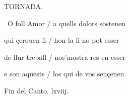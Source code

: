 \documentclass[12pt]{article}
\begin{document}
\begin{estrofaExtra}%




\begin{tornada}

TORNADA.

\end{tornada}


\end{estrofaExtra}


\begin{estrofa}

 \textparagraph\  O foll Amor / a quells dolors sostenen

 qui \c{c}erquen fi / hon la fi no pot esser

 de llur treball / nos'mostra res en esser

 e son aquests / los qui de vos sen\c{c}enen.

\end{estrofa}



\begin{estrofaExtra}%

\begin{final}

Fin del Canto. lxviij.

\end{final}

\end{estrofaExtra}
\end{document}
